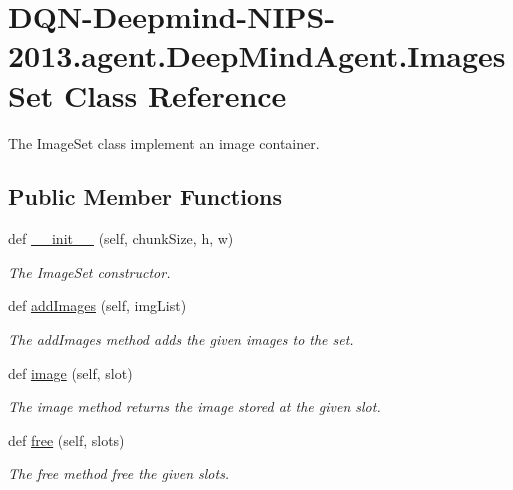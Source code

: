 \hypertarget{classDQN-Deepmind-NIPS-2013_1_1agent_1_1DeepMindAgent_1_1ImagesSet}{}\section{D\+Q\+N-\/\+Deepmind-\/\+N\+I\+P\+S-\/2013.agent.\+Deep\+Mind\+Agent.\+Images\+Set Class Reference}
\label{classDQN-Deepmind-NIPS-2013_1_1agent_1_1DeepMindAgent_1_1ImagesSet}


The Image\+Set class implement an image container.  


\subsection*{Public Member Functions}
\begin{DoxyCompactItemize}
\item 
def \hyperlink{classDQN-Deepmind-NIPS-2013_1_1agent_1_1DeepMindAgent_1_1ImagesSet_ad08d7c16326d59f705dfe03ebf28120d}{\+\_\+\+\_\+init\+\_\+\+\_\+} (self, chunk\+Size, h, w)
\begin{DoxyCompactList}\small\item\em The Image\+Set constructor. \end{DoxyCompactList}\item 
def \hyperlink{classDQN-Deepmind-NIPS-2013_1_1agent_1_1DeepMindAgent_1_1ImagesSet_a27898f9b6851b1e27e34be9842859c7f}{add\+Images} (self, img\+List)
\begin{DoxyCompactList}\small\item\em The add\+Images method adds the given images to the set. \end{DoxyCompactList}\item 
def \hyperlink{classDQN-Deepmind-NIPS-2013_1_1agent_1_1DeepMindAgent_1_1ImagesSet_a044f2ad869a3ff4cf61a7e6eeccc502c}{image} (self, slot)
\begin{DoxyCompactList}\small\item\em The image method returns the image stored at the given slot. \end{DoxyCompactList}\item 
def \hyperlink{classDQN-Deepmind-NIPS-2013_1_1agent_1_1DeepMindAgent_1_1ImagesSet_a5f0032044a746fce8cdcccedc8059b57}{free} (self, slots)
\begin{DoxyCompactList}\small\item\em The free method free the given slots. \end{DoxyCompactList}\end{DoxyCompactItemize}


